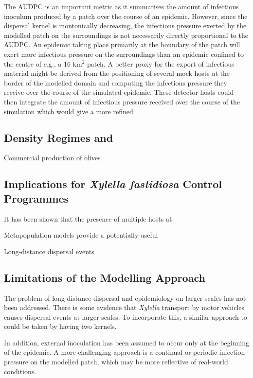 \documentclass[prstpaper]{revtex4-2}
\begin{document}
The AUDPC is an important metric as it summarises the amount of infectious inoculum produced by a patch over the course of an epidemic. However, since the dispersal kernel is montonically decreasing, the infectious pressure exerted by the modelled patch on the surroundings is not necessarily directly proportional to the AUDPC. An epidemic taking place primarily at the boundary of the patch will exert more infectious pressure on the surroundings than an epidemic confined to the centre of e.g., a 16 $\mathrm{km^{2}}$ patch. A better proxy for the export of infectious material might be derived from the positioning of several mock hosts at the border of the modelled domain and computing the infectious pressure they receive over the course of the simulated epidemic. These detector hosts could then integrate the amount of infectious pressure received over the course of the simulation which would give a more refined 

\subsection{Density Regimes and }

Commercial production of olives 

\subsection{Implications for \emph{Xylella fastidiosa} Control Programmes}

It has been shown that the presence of multiple hosts at 



Metapopulation models provide a potentially useful 


Long-distance dispersal events 

\subsection{Limitations of the Modelling Approach}

The problem of long-distance dispersal and epidemiology on larger scales has not been addressed. There is some evidence that \emph{Xylella} transport by motor vehicles causes dispersal events at larger scales. To incorporate this, a similar approach to \cite{White2017} could be taken by having two kernels.

In addition, external inoculation has been assumed to occur only at the beginning of the epidemic. A more challenging approach is a continual or periodic infection pressure on the modelled patch, which may be more reflective of real-world conditions.
\end{document}
